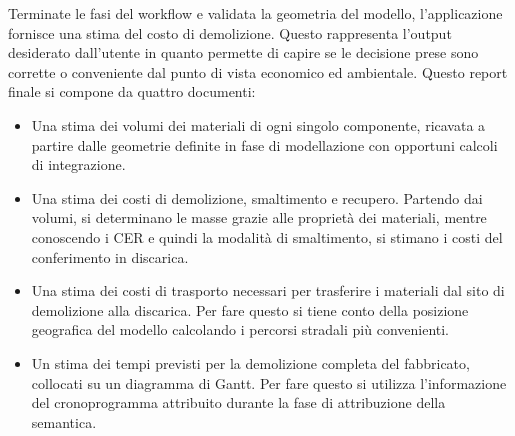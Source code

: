 \noindent Terminate le fasi del workflow e validata la geometria del modello, l'applicazione fornisce una stima del costo di demolizione. Questo rappresenta l'output desiderato dall'utente in quanto permette di capire se le decisione prese sono corrette o conveniente dal punto di vista economico ed ambientale. Questo report finale si compone da quattro documenti:
\begin{itemize}
 \item Una stima dei volumi dei materiali di ogni singolo componente, ricavata a partire dalle geometrie definite in fase di modellazione con opportuni calcoli di integrazione.
 \item Una stima dei costi di demolizione, smaltimento e recupero. Partendo dai volumi, si determinano le masse grazie alle propriet\`a dei materiali, mentre conoscendo i CER e quindi la modalit\`a di smaltimento, si stimano i costi del conferimento in discarica.
 \item Una stima dei costi di trasporto necessari per trasferire i materiali dal sito di demolizione alla discarica. Per fare questo si tiene conto della posizione geografica del modello calcolando i percorsi stradali pi\`u convenienti.
 \item Un stima dei tempi previsti per la demolizione completa del fabbricato, collocati su un diagramma di Gantt. Per fare questo si utilizza l'informazione del cronoprogramma attribuito durante la fase di attribuzione della semantica.

\end{itemize}


\noindent